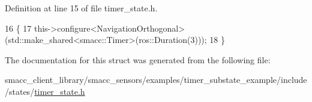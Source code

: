 Definition at line 15 of file timer\+\_\+state.\+h.


\begin{DoxyCode}
16   \{
17     this->configure<NavigationOrthogonal>(std::make\_shared<smacc::Timer>(ros::Duration(3)));
18   \}
\end{DoxyCode}


The documentation for this struct was generated from the following file\+:\begin{DoxyCompactItemize}
\item 
smacc\+\_\+client\+\_\+library/smacc\+\_\+sensors/examples/timer\+\_\+substate\+\_\+example/include/states/\hyperlink{timer__state_8h}{timer\+\_\+state.\+h}\end{DoxyCompactItemize}
